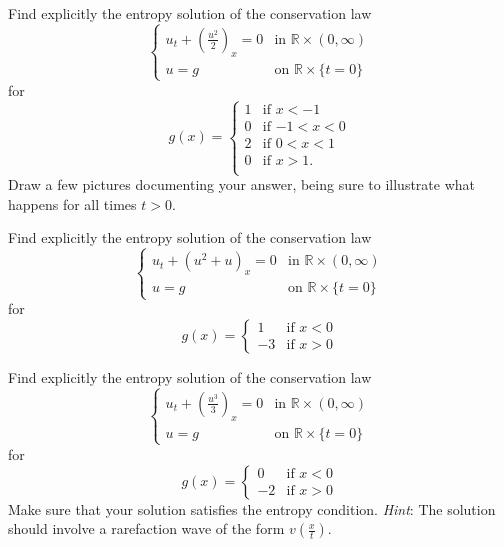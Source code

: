 \documentclass[12pt,fleqn,leqno]{exam}
\begin{document}
\begin{questions}

\question Find explicitly the entropy solution of the conservation law
\[\begin{cases}
u_t + ({\textstyle\frac{u^2}{2}})_x = 0 &\text{in $\mathbb{R} \times (0,\infty)$} \\
u = g &\text{on $\mathbb{R} \times \{t = 0\}$}
\end{cases}\]
for
\[g(x) = \begin{cases}
1 &\text{if $x < -1$} \\
0 &\text{if $-1 < x < 0$} \\
2 &\text{if $0 < x < 1$} \\
0 &\text{if $x > 1$} . \\
\end{cases}\]
Draw a few pictures documenting your answer, being sure to illustrate what happens for all times $t > 0$.

\question Find explicitly the entropy solution of the conservation law
\[\begin{cases}
u_t + (u^2+u)_x = 0 &\text{in $\mathbb{R} \times (0,\infty)$} \\
u = g &\text{on $\mathbb{R} \times \{t = 0\}$}
\end{cases}\]
for
\[g(x) = \begin{cases}
1 &\text{if $x < 0$} \\
-3 &\text{if $x > 0$}
\end{cases}\]

\question Find explicitly the entropy solution of the conservation law
\[\begin{cases}
u_t + ({\textstyle\frac{u^3}{3}})_x = 0 &\text{in $\mathbb{R} \times (0,\infty)$} \\
u = g &\text{on $\mathbb{R} \times \{t = 0\}$}
\end{cases}\]
for
\[g(x) = \begin{cases}
0 &\text{if $x < 0$} \\
-2 &\text{if $x > 0$}
\end{cases}\]
Make sure that your solution satisfies the entropy condition. \emph{Hint}: The solution should involve a rarefaction wave of the form $v(\frac{x}{t})$.

\end{questions}
\end{document}
